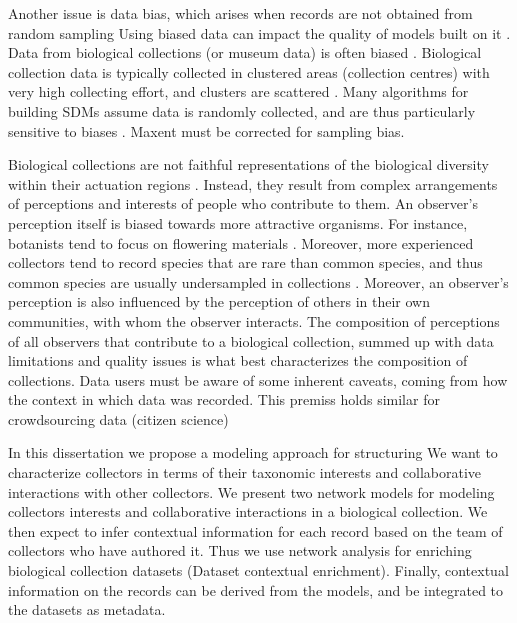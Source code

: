 Another issue is data bias, which arises when records are not obtained from random sampling \cite{Daru2017}
Using biased data can impact the quality of models built on it \cite{Newbold2010}.
Data from biological collections (or museum data) is often biased \cite{Daru2017}.
Biological collection data is typically collected in clustered areas (collection centres) with very high collecting effort, and clusters are scattered \cite{Nelson1990, VanGemerden2005}.
Many algorithms for building SDMs assume data is randomly collected, and are thus particularly sensitive to biases \cite{Araujo2016} .
Maxent must be corrected for sampling bias.%


Biological collections are not faithful representations of the biological diversity within their actuation regions \cite{Funk1999}.
Instead, they result from complex arrangements of perceptions and interests of people who contribute to them.
An observer's perception itself is biased towards more attractive organisms. 
For instance, botanists tend to focus on flowering materials \cite{VanGemerden2005}.
Moreover, more experienced collectors tend to record species that are rare than common species, and thus common species are usually undersampled in collections \cite{Nelson1990}.
Moreover, an observer's perception is also influenced by the perception of others in their own communities, with whom the observer interacts. 
The composition of perceptions of all observers that contribute to a biological collection, summed up with data limitations and quality issues is what best characterizes the composition of collections.
Data users must be aware of some inherent caveats, coming from how the context in which data was recorded. 
This premiss holds similar for crowdsourcing data (citizen science)


In this dissertation we propose a modeling approach for structuring 
We want to characterize collectors in terms of their taxonomic interests and collaborative interactions with other collectors.
We present two network models for modeling collectors interests and collaborative interactions in a biological collection.
We then expect to infer contextual information for each record based on the team of collectors who have authored it.
Thus we use network analysis for enriching biological collection datasets (Dataset contextual enrichment).
Finally, contextual information on the records can be derived from the models, and be integrated to the datasets as metadata. %



